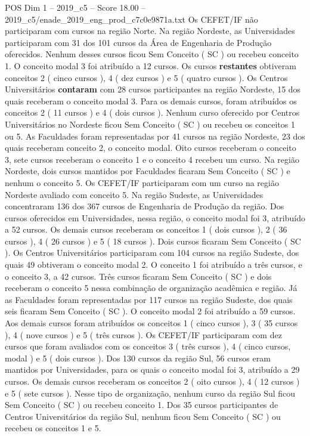 \begin{textsample}{POS Dim 1 – 2019\_c5 – Score 18.00 – 2019\_c5/enade\_2019\_eng\_prod\_c7c0e9871a.txt}
Os CEFET/IF não participaram com cursos na região Norte.
Na região Nordeste, as Universidades participaram com 31 dos 101 cursos da Área de Engenharia de Produção oferecidos.
Nenhum desses cursos ficou Sem Conceito ( SC ) ou recebeu conceito 1.
O conceito modal 3 foi atribuído a 12 cursos.
Os cursos \textbf{restantes} obtiveram conceitos 2 ( cinco cursos ), 4 ( dez cursos ) e 5 ( quatro cursos ).
Os Centros Universitários \textbf{contaram} com 28 cursos participantes na região Nordeste, 15 dos quais receberam o conceito modal 3.
Para os demais cursos, foram atribuídos os conceitos 2 ( 11 cursos ) e 4 ( dois cursos ).
Nenhum curso oferecido por Centros Universitários no Nordeste ficou Sem Conceito ( SC ) ou recebeu os conceitos 1 ou 5.
As Faculdades foram representadas por 41 cursos na região Nordeste, 23 dos quais receberam conceito 2, o conceito modal.
Oito cursos receberam o conceito 3, sete cursos receberam o conceito 1 e o conceito 4 recebeu um curso.
Na região Nordeste, dois cursos mantidos por Faculdades ficaram Sem Conceito ( SC ) e nenhum o conceito 5.
Os CEFET/IF participaram com um curso na região Nordeste avaliado com conceito 5.
Na região Sudeste, as Universidades concentraram 136 dos 367 cursos de Engenharia de Produção da região.
Dos cursos oferecidos em Universidades, nessa região, o conceito modal foi 3, atribuído a 52 cursos.
Os demais cursos receberam os conceitos 1 ( dois cursos ), 2 ( 36 cursos ), 4 ( 26 cursos ) e 5 ( 18 cursos ).
Dois cursos ficaram Sem Conceito ( SC ).
Os Centros Universitários participaram com 104 cursos na região Sudeste, dos quais 49 obtiveram o conceito modal 2.
O conceito 1 foi atribuído a três cursos, e o conceito 3, a 42 cursos.
Três cursos ficaram Sem Conceito ( SC ) e dois receberam o conceito 5 nessa combinação de organização acadêmica e região.
Já as Faculdades foram representadas por 117 cursos na região Sudeste, dos quais seis ficaram Sem Conceito ( SC ).
O conceito modal 2 foi atribuído a 59 cursos.
Aos demais cursos foram atribuídos os conceitos 1 ( cinco cursos ), 3 ( 35 cursos ), 4 ( nove cursos ) e 5 ( três cursos ).
Os CEFET/IF participaram com dez cursos que foram avaliados com os conceitos 3 ( três cursos ), 4 ( cinco cursos, modal ) e 5 ( dois cursos ).
Dos 130 cursos da região Sul, 56 cursos eram mantidos por Universidades, para os quais o conceito modal foi 3, atribuído a 29 cursos.
Os demais cursos receberam os conceitos 2 ( oito cursos ), 4 ( 12 cursos ) e 5 ( sete cursos ).
Nesse tipo de organização, nenhum curso da região Sul ficou Sem Conceito ( SC ) ou recebeu conceito 1.
Dos 35 cursos participantes de Centros Universitários da região Sul, nenhum ficou Sem Conceito ( SC ) ou recebeu os conceitos 1 e 5.

\end{textsample}
